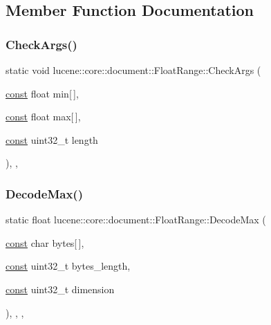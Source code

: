 \subsection{Member Function Documentation}
\mbox{\label{classlucene_1_1core_1_1document_1_1FloatRange_a98e6d50006fd55567e23c446057a8b4a}} 
\subsubsection{\texorpdfstring{Check\+Args()}{CheckArgs()}}
{\footnotesize\ttfamily static void lucene\+::core\+::document\+::\+Float\+Range\+::\+Check\+Args (\begin{DoxyParamCaption}\item[{\mbox{\hyperlink{ZlibCrc32_8h_a2c212835823e3c54a8ab6d95c652660e}{const}} float}]{min\mbox{[}$\,$\mbox{]},  }\item[{\mbox{\hyperlink{ZlibCrc32_8h_a2c212835823e3c54a8ab6d95c652660e}{const}} float}]{max\mbox{[}$\,$\mbox{]},  }\item[{\mbox{\hyperlink{ZlibCrc32_8h_a2c212835823e3c54a8ab6d95c652660e}{const}} uint32\+\_\+t}]{length }\end{DoxyParamCaption})\hspace{0.3cm}{\ttfamily [inline]}, {\ttfamily [static]}, {\ttfamily [private]}}

\mbox{\label{classlucene_1_1core_1_1document_1_1FloatRange_a0adcc9ba52f9818b12f34abdb7d9a47f}} 
\subsubsection{\texorpdfstring{Decode\+Max()}{DecodeMax()}}
{\footnotesize\ttfamily static float lucene\+::core\+::document\+::\+Float\+Range\+::\+Decode\+Max (\begin{DoxyParamCaption}\item[{\mbox{\hyperlink{ZlibCrc32_8h_a2c212835823e3c54a8ab6d95c652660e}{const}} char}]{bytes\mbox{[}$\,$\mbox{]},  }\item[{\mbox{\hyperlink{ZlibCrc32_8h_a2c212835823e3c54a8ab6d95c652660e}{const}} uint32\+\_\+t}]{bytes\+\_\+length,  }\item[{\mbox{\hyperlink{ZlibCrc32_8h_a2c212835823e3c54a8ab6d95c652660e}{const}} uint32\+\_\+t}]{dimension }\end{DoxyParamCaption})\hspace{0.3cm}{\ttfamily [inline]}, {\ttfamily [static]}, {\ttfamily [private]}, {\ttfamily [noexcept]}}

